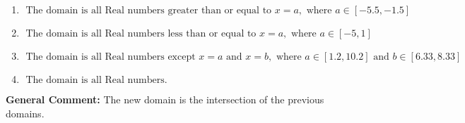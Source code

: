 \documentclass{extbook}[14pt]
\begin{document}
\begin{enumerate}
{\begin{enumerate}[label=\Alph*.]
\item \( \text{ The domain is all Real numbers greater than or equal to } x = a, \text{ where } a \in [-5.5, -1.5] \)


\item \( \text{ The domain is all Real numbers less than or equal to } x = a, \text{ where } a \in [-5, 1] \)


\item \( \text{ The domain is all Real numbers except } x = a \text{ and } x = b, \text{ where } a \in [1.2, 10.2] \text{ and } b \in [6.33, 8.33] \)


\item \( \text{ The domain is all Real numbers. } \)


\end{enumerate}

\textbf{General Comment:} The new domain is the intersection of the previous domains.
}
\end{enumerate}
\end{document}
